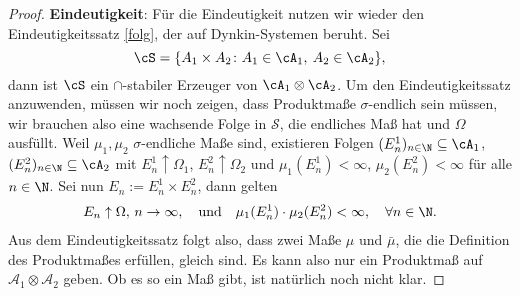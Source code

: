 \begin{proof}
\textbf{Eindeutigkeit}: F\"ur die Eindeutigkeit nutzen wir wieder den Eindeutigkeitssatz \ref{folg}, der auf Dynkin-Systemen beruht. Sei
$$ \cS = \{ A_1 \times A_2\colon A_1 \in \cA_1, \: A_2 \in \cA_2 \},$$ dann ist $\cS$ ein $\cap$-stabiler Erzeuger von $ \cA_1 \otimes \cA_2 $. Um den Eindeutigkeitssatz anzuwenden, m\"ussen wir noch zeigen, dass Produktma\ss e $\sigma$-endlich sein m\"ussen, wir brauchen also eine wachsende Folge in $\mathcal S$, die endliches Ma\ss{} hat und $\Omega$ ausf\"ullt. Weil $\mu_1, \mu_2$ $\sigma$-endliche Ma\ss e sind, existieren Folgen $(E_n^1)_{n \in \N} \subseteq \cA_1$, $(E_n^2)_{n \in \N} \subseteq \cA_2$ mit $E_n^1 \uparrow \Omega_1$, $E_n^2 \uparrow \Omega_2$ und $\mu_1(E_n^1) < \infty$, $\mu_2(E_n^2) < \infty$ f\"ur alle $n \in \N$. Sei nun $E_n := E_n^1 \times E_n^2$, dann gelten
\begin{align*}
	E_n \uparrow \Omega,\, n\to\infty,\quad \text{und}\quad \mu_1(E_n^1) \cdot \mu_2(E_n^2) < \infty,\quad \forall n\in\N.
\end{align*}
	Aus dem Eindeutigkeitssatz folgt also, dass zwei Ma\ss e $\mu$ und $\bar\mu$, die die Definition des Produktma\ss es erf\"ullen, gleich sind. Es kann also nur ein Produktma\ss{} auf $\mathcal A_1\otimes \mathcal A_2$ geben. Ob es so ein Ma\ss{} gibt, ist nat\"urlich noch nicht klar. \smallskip
	

\end{proof}
